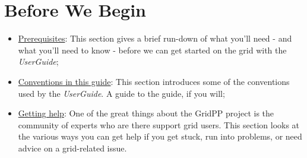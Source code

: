 \section{Before We Begin}
\label{sec:bwb}

\begin{itemize}
\tightlist
\item
  \hyperref[sec:prerequisites]{Prerequisites}: This section gives a brief
  run-down of what you'll need - and what you'll need to know - before
  we can get started on the grid with the \emph{UserGuide};
\item
  \hyperref[sec:conventions]{Conventions in this guide}: This section
  introduces some of the conventions used by the \emph{UserGuide}. A
  guide to the guide, if you will;
\item
  \hyperref[sec:help]{Getting help}: One of the great things about
  the GridPP project is the community of experts who are there support
  grid users. This section looks at the various ways you can get help if
  you get stuck, run into problems, or need advice on a grid-related
  issue.
\end{itemize}

\newpage



\newpage



\newpage


